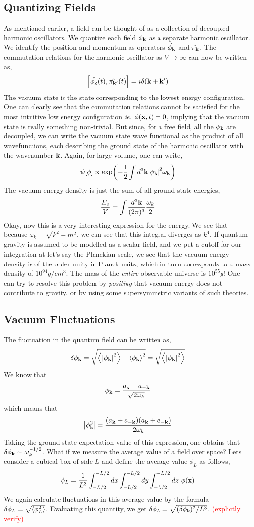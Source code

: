 \documentclass[a4paper,11pt]{article}
\begin{document}
\subsection{Quantizing Fields}
As mentioned earlier, a field can be thought of as a collection of decoupled harmonic oscillators. We quantize each field $\phi_{\vb{k}}$ as a separate harmonic oscillator. We identify the position and momentum as operators $\hat{\phi_{\vb{k}}}$ and $\hat{\pi_{\vb{k}}}$. The commutation relations for the harmonic oscillator as $V\rightarrow \infty$ can now be written as,
$$\comm{\hat{\phi_{\vb{k}}}(t)}{\hat{\pi_{\vb{k'}}}(t)} = i \delta(\vb{k}+\vb{k'})$$
The vacuum state is the state corresponding to the lowest energy configuration. One can clearly see that the commutation relations cannot be satisfied for the most intuitive low energy configuration \textit{ie.} $\phi(\vb{x},t) = 0$, implying that the vacuum state is really something non-trivial. But since, for a free field, all the $\phi_{\vb{k}}$ are decoupled, we can write the vacuum state wave functional as the product of all wavefunctions, each describing the ground state of the harmonic oscillator with the wavenumber $\vb{k}$. Again, for large volume, one can write,
$$\psi[\phi] \propto \exp(-\frac{1}{2}\int d^3 \vb{k} \abs{\phi_{\vb{k}}}^2 \omega_{\vb{k}})$$
The vacuum energy density is just the sum of all ground state energies,
$$\frac{E_o}{V}= \int\frac{d^3 \vb{k}}{(2\pi)^3} \frac{\omega_{k}}{2}$$
Okay, now this is a very interesting expression for the energy. We see that because $\omega_k = \sqrt{k^2+m^2}$, we can see that this integral diverges as $k^4$. If quantum gravity is assumed to be modelled as a scalar field, and we put a cutoff for our integration at let's say the Planckian scale, we see that the vacuum energy density is of the order unity in Planck units, which in turn corresponds to a mass density of $10^{94} g/cm^3$. The mass of the \textit{entire} observable universe is $10^{55}g$! One can try to resolve this problem by \textit{positing} that vacuum energy does not contribute to gravity, or by using some supersymmetric variants of such theories.

\subsection{Vacuum Fluctuations}
The fluctuation in the quantum field can be written as,
$$\delta \phi_{\vb{k}} = \sqrt{\expval{\abs{\phi_{\vb{k}}}^2} - \expval{\phi_{\vb{k}}}^2} = \sqrt{\expval{\abs{\phi_{\vb{k}}}^2}}$$
We know that $$\phi_{\vb{k}} = \frac{a_{\vb{k}} + a_{-\vb{k}}}{\sqrt{2\omega_k}}$$ which means that 
$$\abs{\phi_{\vb{k}}^2} = \frac{(a_{\vb{k}} + a_{-\vb{k}})(a_{\vb{k}} + a_{-\vb{k}})}{{2\omega_k}}$$
Taking the ground state expectation value of this expression, one obtains that $\delta \phi_{\vb{k}} \sim \omega_k^{-1/2}$. What if we measure the average value of a field over space? Lets consider a cubical box of side $L$  and define the average value $\phi_L$ as follows,
$$\phi_L = \frac{1}{L^3} \int_{-L/2}^{-L/2}dx \int_{-L/2}^{-L/2}dy \int_{-L/2}^{-L/2}dz \ \phi(\vb{x})$$
We again calculate fluctuations in this average value by the formula $\delta \phi_L = \sqrt{\expval{\phi_L^2}}$. Evaluating this quantity, we get $\delta \phi_L = \sqrt{(\delta \phi_{\vb{k}})^2/L^3}$. \textcolor{red}{(explictly verify)}
\end{document}
